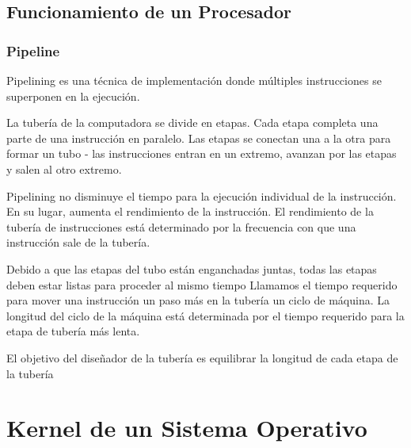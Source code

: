 \documentclass[12pt, fleqn]{report}                             %
\begin{document}
        \section{Funcionamiento de un Procesador}

            \subsection{Pipeline}

                Pipelining es una técnica de implementación donde múltiples instrucciones se superponen en
                la ejecución.

                La tubería de la computadora se divide en etapas. Cada etapa completa una parte de una instrucción en paralelo. Las etapas se conectan una a la otra para formar un tubo - las instrucciones entran en un extremo, avanzan por las etapas y salen al otro extremo.

                Pipelining no disminuye el tiempo para la ejecución individual de la instrucción.
                En su lugar, aumenta el rendimiento de la instrucción.
                El rendimiento de la tubería de instrucciones está determinado por la frecuencia con que una
                instrucción sale de la tubería.

                Debido a que las etapas del tubo están enganchadas juntas, todas las etapas deben estar listas
                para proceder al mismo tiempo
                Llamamos el tiempo requerido para mover una instrucción un paso más en la tubería un ciclo de máquina.
                La longitud del ciclo de la máquina está determinada por el tiempo requerido para la etapa de tubería
                más lenta.

                El objetivo del diseñador de la tubería es equilibrar la longitud de cada etapa de la tubería





    \chapter{Kernel de un Sistema Operativo}
\end{document}
